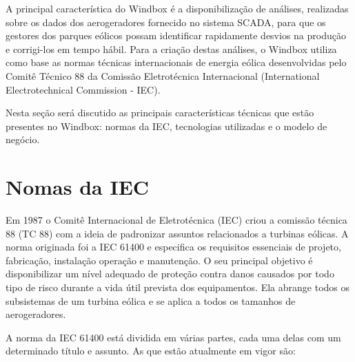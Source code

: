 
\label{Cap:desenvolvimento-da-solucao}

A principal característica do Windbox é a disponibilização de análises, realizadas sobre os dados dos aerogeradores fornecido no sistema SCADA, para que os gestores dos parques eólicos possam identificar rapidamente desvios na produção e corrigi-los em tempo hábil. Para a criação destas análises, o Windbox utiliza como base as normas técnicas internacionais de energia eólica desenvolvidas pelo Comitê Técnico 88 da Comissão Eletrotécnica Internacional (International Electrotechnical Commission - IEC). 

Nesta seção será discutido as principais características técnicas que estão presentes no Windbox: normas da IEC, tecnologias utilizadas e o modelo de negócio.

\section{Nomas da IEC}
\label{Sec:normas-iec}

Em 1987 o Comitê Internacional de Eletrotécnica (IEC) criou a comissão técnica 88 (TC 88) com a ideia de padronizar assuntos relacionados a turbinas eólicas. A norma originada foi a IEC 61400 e especifica os requisitos essenciais de projeto, fabricação, instalação operação e manutenção. O seu principal objetivo é disponibilizar um nível adequado de proteção contra danos causados por todo tipo de risco durante a vida útil prevista dos equipamentos. Ela abrange todos os subsistemas de um turbina eólica e se aplica a todos os tamanhos de aerogeradores.

A norma da IEC 61400 está dividida em várias partes, cada uma delas com um determinado título e assunto. As que estão atualmente em vigor são:

